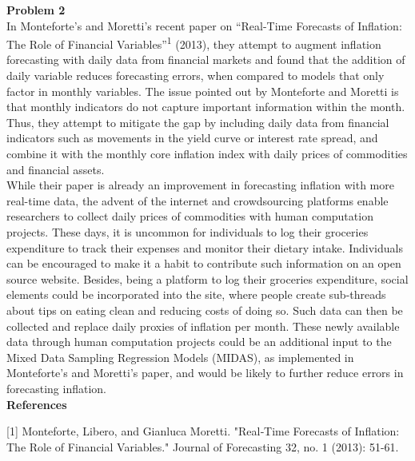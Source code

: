 \documentclass[letterpaper,12pt]{article}
\theoremstyle{definition}
\begin{document}
\newpage
\noindent\textbf{Problem 2}\\
\flushleft In Monteforte’s and Moretti’s recent paper on “Real-Time Forecasts of Inflation: The Role of Financial Variables”\textsuperscript{1} (2013), they attempt to augment inflation forecasting with daily data from financial markets and found that the addition of daily variable reduces forecasting errors, when compared to models that only factor in monthly variables. The issue pointed out by Monteforte and Moretti is that monthly indicators do not capture important information within the month. Thus, they attempt to mitigate the gap by including daily data from financial indicators such as movements in the yield curve or interest rate spread, and combine it with the monthly core inflation index with daily prices of commodities and financial assets. \\
\flushleft
While their paper is already an improvement in forecasting inflation with more real-time data, the advent of the internet and crowdsourcing platforms enable researchers to collect daily prices of commodities with human computation projects. These days, it is uncommon for individuals to log their groceries expenditure to track their expenses and monitor their dietary intake. Individuals can be encouraged to make it a habit to contribute such information on an open source website. Besides, being a platform to log their groceries expenditure, social elements could be incorporated into the site, where people create sub-threads about tips on eating clean and reducing costs of doing so. Such data can then be collected and replace daily proxies of inflation per month. These newly available data through human computation projects could be an additional input to the Mixed Data Sampling Regression Models (MIDAS), as implemented in Monteforte’s and Moretti’s paper, and would be likely to further reduce errors in forecasting inflation. \\
\flushleft
\textbf{References}

[1] Monteforte, Libero, and Gianluca Moretti. "Real‐Time Forecasts of Inflation: The Role of Financial Variables." Journal of Forecasting 32, no. 1 (2013): 51-61.
\end{document}
